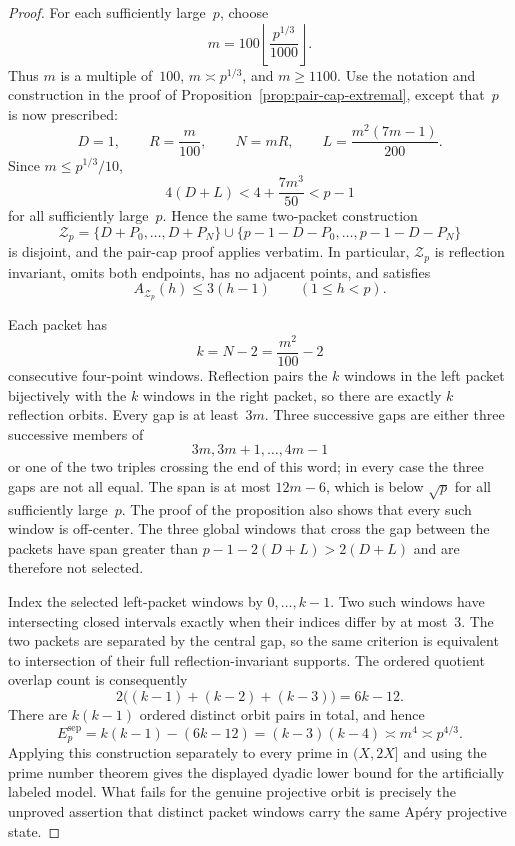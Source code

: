 \begin{proof}
For each sufficiently large~$p$, choose
\[
 m=100\left\lfloor\frac{p^{1/3}}{1000}\right\rfloor.
\]
Thus $m$ is a multiple of~$100$, $m\asymp p^{1/3}$, and $m\ge1100$.
Use the notation and construction in the proof of
Proposition~\ref{prop:pair-cap-extremal}, except that~$p$ is now prescribed:
\[
 D=1,\qquad R=\frac m{100},\qquad N=mR,\qquad
 L=\frac{m^2(7m-1)}{200}.
\]
Since $m\le p^{1/3}/10$,
\[
 4(D+L)<4+\frac{7m^3}{50}<p-1
\]
for all sufficiently large~$p$.  Hence the same two-packet construction
\[
 \mathcal Z_p
 =\{D+P_0,\ldots,D+P_N\}
  \cup\{p-1-D-P_0,\ldots,p-1-D-P_N\}
\]
is disjoint, and the pair-cap proof applies verbatim.  In particular,
$\mathcal Z_p$ is reflection invariant, omits both endpoints, has no
adjacent points, and satisfies
\[
 A_{\mathcal Z_p}(h)\le3(h-1)
 \qquad(1\le h<p).
\]

Each packet has
\[
 k=N-2=\frac{m^2}{100}-2
\]
consecutive four-point windows.  Reflection pairs the $k$ windows in the
left packet bijectively with the $k$ windows in the right packet, so there
are exactly $k$ reflection orbits.  Every gap is at least~$3m$.  Three
successive gaps are either three successive members of
\[
 3m,3m+1,\ldots,4m-1
\]
or one of the two triples crossing the end of this word; in every case the
three gaps are not all equal.  The span is at most $12m-6$, which is below
$\sqrt p$ for all sufficiently large~$p$.  The proof of the proposition
also shows that every such window is off-center.  The three global windows
that cross the gap between the packets have span greater than
$p-1-2(D+L)>2(D+L)$ and are therefore not selected.

Index the selected left-packet windows by $0,\ldots,k-1$.  Two such windows
have intersecting closed intervals exactly when their indices differ by at
most~$3$.  The two packets are separated by the central gap, so the same
criterion is equivalent to intersection of their full reflection-invariant
supports.  The ordered quotient overlap count is consequently
\[
 2\bigl((k-1)+(k-2)+(k-3)\bigr)=6k-12.
\]
There are $k(k-1)$ ordered distinct orbit pairs in total, and hence
\[
 E_p^{\mathrm{sep}}
 =k(k-1)-(6k-12)
 =(k-3)(k-4)
 \asymp m^4\asymp p^{4/3}.
\]
Applying this construction separately to every prime in $(X,2X]$ and using
the prime number theorem gives the displayed dyadic lower bound for the
artificially labeled model.  What fails for the genuine projective orbit is
precisely the unproved assertion that distinct packet windows carry the same
Ap\'ery projective state.
\end{proof}
